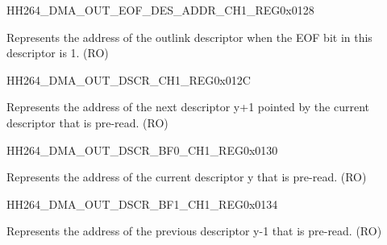 \begin{register}{H}{H264\_DMA\_OUT\_EOF\_DES\_ADDR\_CH1\_REG}{0x0128}\label{regdesc:H264DMAOUTEOFDESADDRCH1REG}
%
\regnewline%
\begin{regdesc}\begin{reglist}
\label{fielddesc:H264DMAOUTEOFDESADDRCH1}\item [H264\_DMA\_OUT\_EOF\_DES\_ADDR\_CH1] Represents the address of the outlink descriptor when the EOF bit in this descriptor is 1. (RO)
\end{reglist}\end{regdesc}
\end{register}


\begin{register}{H}{H264\_DMA\_OUT\_DSCR\_CH1\_REG}{0x012C}\label{regdesc:H264DMAOUTDSCRCH1REG}
%
\regnewline%
\begin{regdesc}\begin{reglist}
\label{fielddesc:H264DMAOUTLINKDSCRCH1}\item [H264\_DMA\_OUTLINK\_DSCR\_CH1] Represents the address of the next descriptor y+1 pointed by the current descriptor that is pre-read. (RO)
\end{reglist}\end{regdesc}
\end{register}


\begin{register}{H}{H264\_DMA\_OUT\_DSCR\_BF0\_CH1\_REG}{0x0130}\label{regdesc:H264DMAOUTDSCRBF0CH1REG}
%
\regnewline%
\begin{regdesc}\begin{reglist}
\label{fielddesc:H264DMAOUTLINKDSCRBF0CH1}\item [H264\_DMA\_OUTLINK\_DSCR\_BF0\_CH1] Represents the address of the current descriptor y that is pre-read. (RO)
\end{reglist}\end{regdesc}
\end{register}


\begin{register}{H}{H264\_DMA\_OUT\_DSCR\_BF1\_CH1\_REG}{0x0134}\label{regdesc:H264DMAOUTDSCRBF1CH1REG}
%
\regnewline%
\begin{regdesc}\begin{reglist}
\label{fielddesc:H264DMAOUTLINKDSCRBF1CH1}\item [H264\_DMA\_OUTLINK\_DSCR\_BF1\_CH1] Represents the address of the previous descriptor y-1 that is pre-read. (RO)
\end{reglist}\end{regdesc}
\end{register}

